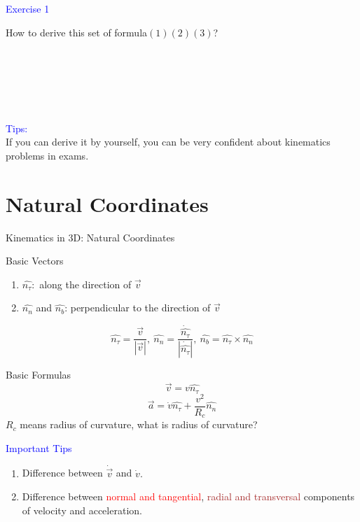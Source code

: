 \documentclass{beamer}
\begin{document}
\begin{frame}
\textcolor{blue}{Exercise 1}

How to derive this set of formula$(1)(2)(3)$?\\ \pause
~\\
~\\
~\\
~\\
~\\
~\\
\textcolor{blue}{Tips:}\\
If you can derive it by yourself, you can be very confident about kinematics problems in exams.
\end{frame}

\section{Natural Coordinates}
\begin{frame}{Kinematics in 3D: Natural Coordinates}
  \begin{block}{Basic Vectors}
    \begin{enumerate}
      \item $\hat{n_\tau}:$ along the direction of $\vec{v}$
      \item $\hat{n_n}$ and $\hat{n_b}$: perpendicular to the direction of $\vec{v}$
    \end{enumerate}
    $$
      \hat{n_\tau}=\frac{\vec{v}}{|\vec{v}|},\ 
      \hat{n_n}=\frac{\dot{\hat{n_\tau}}}{|\dot{\hat{n_\tau}}|},\ 
      \hat{n_b}=\hat{n_\tau}\times \hat{n_n}
      $$
  \end{block}\pause
  \begin{block}{Basic Formulas}
    $$\vec{v}=v\hat{n_\tau}$$
    $$\vec{a}=\dot{v}\hat{n_\tau}+\frac{v^2}{R_c}\hat{n_n}$$
    $R_c$ means radius of curvature, what is radius of curvature?
  \end{block}
\end{frame}

\begin{frame}
  \textcolor{blue}{Important Tips}
  \begin{enumerate}
    \item Difference between $\dot{\vec{v}}$ and $\dot{v}.$\pause
    \item Difference between \textcolor{red}{normal and tangential}, \textcolor{brown}{radial and transversal} components of velocity and acceleration.
  \end{enumerate}
\end{frame}
\end{document}
